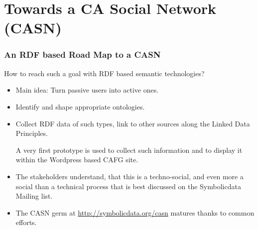 \documentclass{beamer}
\begin{document}
\section{Towards a CA Social Network (CASN)}

\begin{frame}\frametitle{An RDF based Road Map to a CASN}
How to reach such a goal with RDF based semantic technologies?
\begin{itemize}
\item Main idea: Turn passive users into active ones.
\item Identify and shape appropriate ontologies. 
\item Collect RDF data of such types, link to other sources along the Linked
  Data Principles.

  A very first prototype is used to collect such information and to display
  it within the Wordpress based CAFG site.
\item The stakeholders understand, that this is a techno-social, and even more
  a social than a technical process that is best discussed on the Symbolicdata
  Mailing list.
\item The CASN germ at \url{http://symbolicdata.org/casn} matures thanks to
  common efforts.
\end{itemize}
\end{frame}
\end{document}
